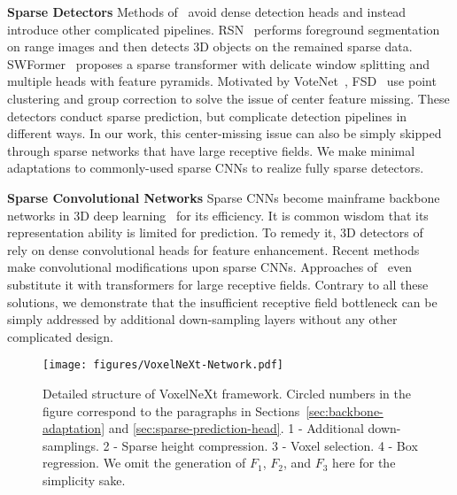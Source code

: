 \documentclass[10pt,twocolumn,letterpaper]{article}
\begin{document}
\vspace{0.5em}
\noindent
\textbf{Sparse Detectors}
Methods of~\cite{fsd,rsn,swformer} avoid dense detection heads and instead introduce other complicated pipelines. RSN~\cite{rsn} performs foreground segmentation on range images and then detects 3D objects on the remained sparse data. SWFormer~\cite{swformer} proposes a sparse transformer with delicate window splitting and multiple heads with feature pyramids. Motivated by VoteNet~\cite{votenet}, FSD~\cite{fsd}
use point clustering and group correction to solve the issue of center feature missing. These detectors conduct sparse prediction, but complicate detection pipelines in different ways. In our work, this center-missing issue can also be simply skipped through sparse networks that have large receptive fields. We make minimal adaptations to commonly-used sparse CNNs to realize fully sparse detectors.


\vspace{0.5em}
\noindent
\textbf{Sparse Convolutional Networks}
Sparse CNNs become mainframe backbone networks in 3D deep learning~\cite{pvrcnn, chu2021icm, chu2022twist, jiang2021guided} for its efficiency. It is common wisdom that its representation ability is limited for prediction. To remedy it, 3D detectors of~\cite{second,pvrcnn,voxel-rcnn,infofocus} rely on dense convolutional heads for feature enhancement. Recent methods~\cite{focalsconv,spatial-pruned-conv} make convolutional modifications upon sparse CNNs. Approaches of~\cite{voxeltransformer,voxelset} even substitute it with transformers for large receptive fields. Contrary to all these solutions, we demonstrate that the insufficient receptive field bottleneck can be simply addressed by additional down-sampling layers without any other complicated design.

\begin{figure}[t]
\begin{center}
   \texttt{[image: figures/VoxelNeXt-Network.pdf]}
   \caption{Detailed structure of VoxelNeXt framework. Circled numbers in the figure correspond to the paragraphs in Sections~\ref{sec:backbone-adaptation} and \ref{sec:sparse-prediction-head}. 1 - Additional down-samplings. 2 - Sparse height compression. 3 - Voxel selection. 4 - Box regression. 
   We omit the generation of $F_1$, $F_2$, and $F_3$ here for the simplicity sake.}
   \label{fig:voxelnext-details}
\end{center}
\end{figure}
\end{document}
